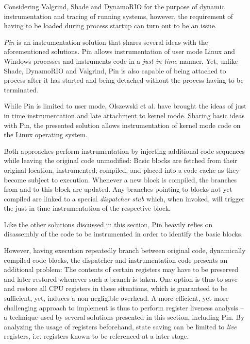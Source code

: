 Considering Valgrind, Shade and DynamoRIO for the purpose of dynamic instrumentation and tracing 
of running systems, however, the requirement of having to be loaded during process startup 
can turn out to be an issue. 

\emph{Pin} \cite{Pin05} is an instrumentation solution that shares several ideas with 
the aforementioned solutions. Pin allows instrumentation of user mode Linux and Windows processes and 
instruments code in a \emph{just in time} manner. Yet, unlike Shade, DynamoRIO and Valgrind, Pin is 
also capable of being attached to process after it has started and being detached without the
process having to be terminated.

While Pin is limited to user mode, Olszewski et al. \cite{Olszewski07} have brought the ideas of 
just in time instrumentation and late attachment to kernel mode. 
Sharing basic ideas with Pin, the presented solution 
allows instrumentation of kernel mode code on the Linux operating system.

Both approaches perform instrumentation by injecting additional
code sequences while leaving the original code unmodified: Basic blocks
are fetched from their original location, instrumented, compiled, and placed into a 
code cache as they become subject to execution. Whenever a new block is 
compiled, the branches from and to this block are updated. 
Any branches pointing to blocks not yet compiled are linked to 
a special \emph{dispatcher stub} which, when invoked, will trigger the 
just in time instrumentation of the respective block. 

Like the other solutions discussed in this section, Pin heavily 
relies on disassembly of the code to be instrumented 
in order to identify the basic blocks. 

However, having execution repeatedly branch between original code, dynamically
compiled code blocks, the dispatcher and instrumentation code 
presents an additional problem: The contents of certain registers may have to 
be preserved and later restored whenever such a branch is taken. 
One option is thus to save and restore all CPU registers in these situations,
which is guaranteed to be sufficient, yet, induces a non-negligible overhead. 
A more efficient, yet more challenging approach to implement is thus
to perform register liveness analysis -- a technique used by several solutions 
presented in this section, including Pin. By analyzing the usage of registers
beforehand, state saving can be limited to \emph{live} registers, i.e. registers
known to be referenced at a later stage.

